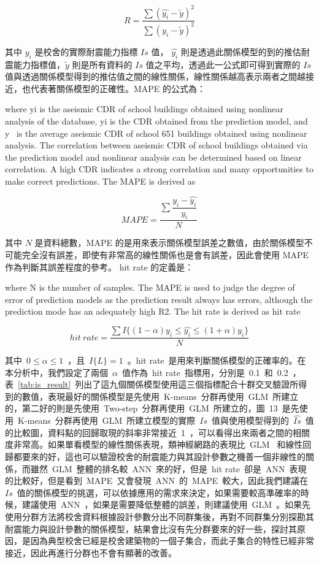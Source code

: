 \begin{equation} R = \dfrac{\sum{(\hat{y_i} - \tilde{y})^2}}{\sum{(y_i - \tilde{y})^2}} \label{eq:RSQ}\end{equation} 

其中 $y_i$ 是校舍的實際耐震能力指標 $Is$ 值， $\hat{y_i}$ 則是透過此關係模型的到的推估耐震能力指標值，$\tilde{y}$ 則是所有資料的 $Is$ 值之平均，透過此一公式即可得到實際的 $Is$ 值與透過關係模型得到的推估值之間的線性關係，線性關係越高表示兩者之間越接近，也代表著關係模型的正確性。MAPE 的公式為：

where yi is the aseismic CDR of school buildings obtained using nonlinear analysis of the database, yi is the CDR obtained from the prediction model, and y~ is the average aseismic CDR of school 651 buildings obtained using nonlinear analysis. The correlation between aseismic CDR of school buildings obtained via the prediction model and nonlinear analysis can be determined based on linear correlation. A high CDR indicates a strong correlation and many opportunities to make correct predictions. The MAPE is derived as

\begin{equation} MAPE = \dfrac{\sum{\dfrac{y_i - \hat{y_i}}{y_i}}}{N} \label{eq:MAPE}\end{equation} 

其中 $N$ 是資料總數，MAPE 的是用來表示關係模型誤差之數值，由於關係模型不可能完全沒有誤差，即使有非常高的線性關係也是會有誤差，因此會使用 MAPE 作為判斷其誤差程度的參考。 hit rate 的定義是：

where N is the number of samples. The MAPE is used to judge the  degree of error of prediction models as the prediction result always has errors, although the prediction mode has an adequately high R2. The hit rate is derived as 
hit rate

\begin{equation} hit\ rate = \dfrac{ \sum{I\{(1 - \alpha)y_i \le \hat{y_i} \le (1 + \alpha)y_i \}} }{N} \label{eq:hitrate}\end{equation} 

其中~$0 \le \alpha \le 1$~，且~$I\{L\} = 1$~。hit rate~是用來判斷關係模型的正確率的。在本分析中，我們設定了兩個~$\alpha$~值作為~hit rate~指標用，分別是~0.1~和~0.2~，表~\ref{tab:is_result}~列出了這九個關係模型使用這三個指標配合十群交叉驗證所得到的數值，表現最好的關係模型是先使用~K-means~分群再使用~GLM~所建立的，第二好的則是先使用~Two-step~分群再使用~GLM~所建立的，圖~13~是先使用~K-means~分群再使用~GLM~所建立模型的實際~$Is$~值與使用模型得到的~$\hat{Is}$~值的比較圖，資料點的回歸取現的斜率非常接近~1~，可以看得出來兩者之間的相關度非常高。如果單看模型的線性關係表現，類神經網路的表現比~GLM~ 和線性回歸都要來的好，這也可以驗證校舍的耐震能力與其設計參數之機善一個非線性的關係，而雖然~GLM~整體的排名較~ANN~來的好，但是~hit rate~卻是~ANN~表現的比較好，但是看到~MAPE~又會發現~ANN~的~MAPE~較大，因此我們建議在~$Is$~值的關係模型的挑選，可以依據應用的需求來決定，如果需要較高準確率的時候，建議使用~ANN~，如果是需要降低整體的誤差，則建議使用~GLM~。如果先使用分群方法將校舍資料根據設計參數分出不同群集後，再對不同群集分別探勘其耐震能力與設計參數的關係模型，結果會比沒有先分群要來的好一些，探討其原因，是因為典型校舍已經是校舍建築物的一個子集合，而此子集合的特性已經非常接近，因此再進行分群也不會有顯著的改善。


